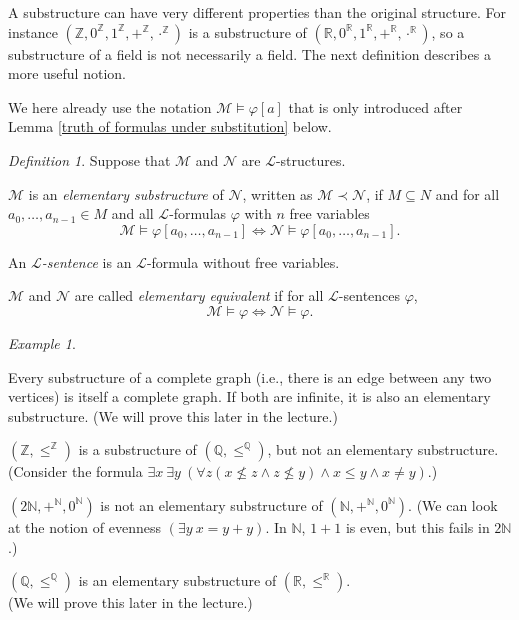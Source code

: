 \documentclass[a4paper, 11pt]{amsart}
\theoremstyle{remark}
\newtheorem{definition}[definition]{Definition}
\newtheorem{example}[example]{Example}
\newcommand{\NN}{\mathbb{N}}
\newcommand{\ZZ}{\mathbb{Z}}
\newcommand{\QQ}{\mathbb{Q}}
\newcommand{\RR}{\mathbb{R}}
\newcommand{\cL}{\mathcal L}
\newcommand{\cM}{\mathcal M}
\newcommand{\cN}{\mathcal N}
\newenvironment{enumerate-(1)}{\begin{enumerate}[label={\upshape (\arabic*)}, leftmargin=2pc]}{\end{enumerate}}
\begin{document}
A substructure can have very different properties than the original structure. 
For instance $(\ZZ,0^\ZZ,1^\ZZ,+^\ZZ,\cdot^\ZZ)$ is a substructure of  $(\RR,0^\RR,1^\RR,+^\RR,\cdot^\RR)$, so a substructure of a field is not necessarily a field. 
The next definition describes a more useful notion. 

We here already use the notation $\cM \models \varphi[a]$ that is only introduced after Lemma \ref{truth of formulas under substitution} below. 

\begin{definition} 
\label{definition elementary substructure} 
Suppose that  $\cM$ and  $\cN$ are $\cL$-structures. 
\begin{enumerate-(1)} 
\item 
$\cM$ is an \emph{elementary substructure} of $\cN$, written as $\cM\prec \cN$, if $M\subseteq N$ and for all $a_0,\dots, a_{n-1} \in M$ and all $\cL$-formulas $\varphi$ with $n$ free variables 
$$ \cM \models \varphi[a_0, \dots, a_{n-1}] \Longleftrightarrow \cN \models \varphi[a_0, \dots, a_{n-1}]  .$$ 
\item 
An \emph{$\cL$-sentence} is an $\cL$-formula without free variables. 
\item 
$\cM$ and $\cN$ are called \emph{elementary equivalent} if for all $\cL$-sentences $\varphi$, 
$$ \cM \models \varphi \Longleftrightarrow \cN \models \varphi .$$ 
\end{enumerate-(1)} 
\end{definition} 

\begin{example} \ 
\begin{enumerate-(1)} 
\item 
Every substructure of a complete graph (i.e., there is an edge between any two vertices) is itself a complete graph. 
If both are infinite, it is also an elementary substructure. 
(We will prove this later in the lecture.) 
\item 
$(\ZZ,\leq^\ZZ)$ is a substructure of $(\QQ,\leq^\QQ)$, but not an elementary substructure. \ \\ 
(Consider the formula $\exists x\ \exists y\ (\forall z (x\not\leq z \wedge z\not \leq y) \wedge x\leq y \wedge x\neq y) $.) 
\item 
$(2 \NN, +^\NN, 0^\NN)$ is not an elementary substructure of $(\NN, +^\NN, 0^\NN)$. 
(We can look at the notion of evenness $(\exists y\ x= y+y)$. In $\NN$, $1+1$ is even, but this fails in $2\NN$.) 
\item 
$(\QQ,\leq^\QQ)$ is an elementary substructure of $(\RR,\leq^\RR)$. \ \\ 
(We will prove this later in the lecture.)
\end{enumerate-(1)} 
\end{example} 
\end{document}
